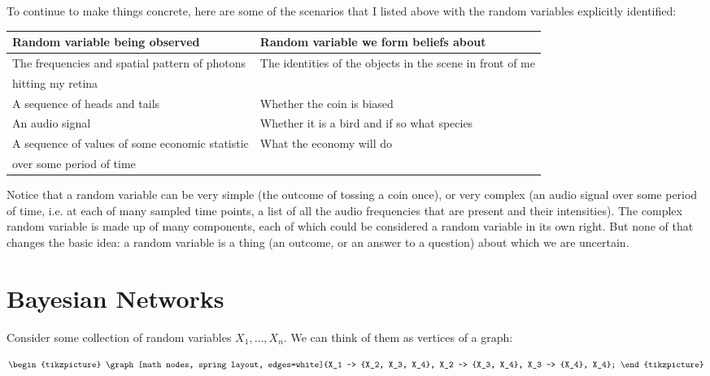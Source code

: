 To continue to make things concrete, here are some of the scenarios that I listed above with the random variables explicitly identified:

\begin{table}[h!]
  \centering
  \begin{tabular}{|l|l|}
    \hline
    {\bf Random variable being observed} & {\bf Random variable we form beliefs about} \\
    \hline
    The frequencies and spatial pattern of photons  & The identities of the objects in the scene in front of me \\
    hitting my retina & \\
    \hline
    A sequence of heads and tails  & Whether the coin is biased \\
    \hline
    An audio signal                    & Whether it is a bird and if so what species \\
    \hline
    A sequence of values of some economic statistic & What the economy will do \\
    over some period of time   & \\
    \hline
  \end{tabular}
\end{table}

Notice that a random variable can be very simple (the outcome of tossing a coin once), or very complex (an audio signal over some period of time, i.e. at each of many sampled time points, a list of all the audio frequencies that are present and their intensities). The complex random variable is made up of many components, each of which could be considered a random variable in its own right. But none of that changes the basic idea: a random variable is a thing (an outcome, or an answer to a question) about which we are uncertain.





\section{Bayesian Networks}


Consider some collection of random variables $X_1, \ldots, X_n$. We can think of them as vertices of a graph:

\begin{align*}
\begin{tikzpicture}
  \graph[math nodes, spring layout, edges=white]{X_1 -> {X_2, X_3, X_4}, X_2 -> {X_3, X_4}, X_3 -> {X_4}, X_4};
\end{tikzpicture}
\end{align*}


